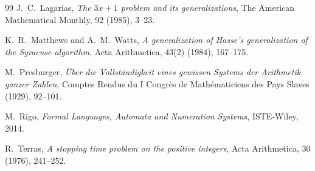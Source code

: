 \documentclass[runningheads]{llncs}
\begin{document}
\begin{thebibliography}{99}
J.~C.~Lagarias,
\emph{The $3x+1$ problem and its generalizations},
The American Mathematical Monthly, 92 (1985), 3--23.

K.~R.~Matthews and A.~M.~Watts,
\emph{A generalization of Hasse's generalization of the Syracuse
algorithm},
Acta Arithmetica, 43(2) (1984), 167--175.

M.~Presburger,
\emph{\"Uber die Vollst\"andigkeit eines gewissen Systems der
Arithmetik ganzer Zahlen},
Comptes Rendus du I Congr\`es de Math\'ematiciens des Pays Slaves
(1929), 92--101.

M.~Rigo,
\emph{Formal Languages, Automata and Numeration Systems},
ISTE-Wiley, 2014.

R.~Terras,
\emph{A stopping time problem on the positive integers},
Acta Arithmetica, 30 (1976), 241--252.

\end{thebibliography}
\end{document}
